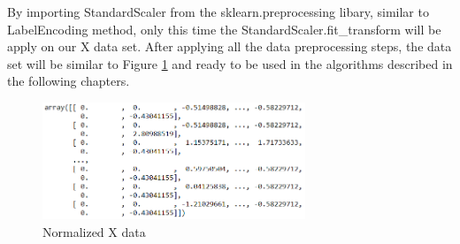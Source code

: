 By importing StandardScaler from the  sklearn.preprocessing libary, similar to LabelEncoding method, only this time the StandardScaler.fit\_transform will be apply on our X data set. After applying all the data preprocessing steps, the data set will be similar to Figure \ref{fig:xtrain_data} and ready to be used in the algorithms described in the following chapters.


\begin{figure}[h]
    \centering
    \includegraphics[width=0.7\textwidth,height=0.17\textheight]{Chapters/Figures/X_train.png}
    \caption{Normalized X data}
    \label{fig:xtrain_data}
\end{figure}